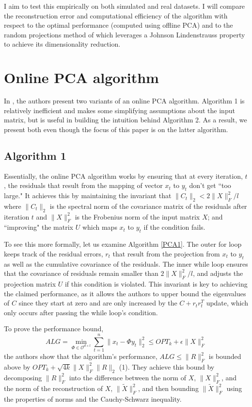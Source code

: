 \documentclass[11pt, oneside]{amsart}
\begin{document}
I aim to test this empirically on both simulated and real datasets. I will compare the reconstruction error and computational efficiency of the algorithm with respect to the optimal performance (computed using offline PCA) and to the random projections method of \cite{sarlos} which leverages a Johnson Lindenstrauss property to achieve its dimensionality reduction. 



\section{Online PCA algorithm}
In \cite{onlinepca}, the authors present two variants of an online PCA algorithm. Algorithm 1 is relatively inefficient and makes some simplifying assumptions about the input matrix, but is useful in building the intuition behind Algorithm 2. As a result, we present both even though the focus of this paper is on the latter algorithm.

\subsection{Algorithm 1}

Essentially, the online PCA algorithm works by ensuring that at every iteration, $t$, the residuals that result from the mapping of vector $x_t$ to $y_t$ don't get ``too large." It achieves this by  maintaining the invariant that $\| C_t\|_2 < 2 \| X\|_F^2/l$ where $\|C_t\|_2$ is the spectral norm of the covariance matrix of the residuals after iteration $t$ and $\| X\|_F^2$ is the Frobenius norm of the input matrix $X$; and ``improving" the matrix $U$ which maps $x_t$ to $y_t$ if the condition fails.

To see this more formally, let us examine Algorithm \ref{PCA1}. The outer for loop keeps track of the residual errors, $r_t$ that result from the projection from $x_t$ to $y_t$ as well as the cumulative covariance of the residuals. The inner while loop ensures that the covariance of residuals remain smaller than $2\|X\|_F^2/l$, and adjusts the projection matrix $U$ if this condition is violated. This invariant is key to achieving the claimed performance, as it allows the authors to upper bound the eigenvalues of $C$ since they start at zero and are only increased by the $C + r_t r_t^T$ update, which only occurs after passing the while loop's condition. 

To prove the performance bound, 
\[
ALG = \min_{\Phi \in \mathcal{O}^{d\times l}}\sum_{t=1}^n\|x_t - \Phi y_t\|_2^2\leq OPT_k + \epsilon \|X\|_F^2\]
the authors show that the algorithm's performance, $ALG \leq \|R\|_F^2$ is bounded above by $OPT_k + \sqrt{4k} \|X\|_F^2\|R\|_2$ (1). They achieve this bound by decomposing $\|R\|_F^2$ into the difference between the norm of $X$, $\|X\|_F^2$, and the norm of the reconstruction of $X$, $\|\tilde{X}\|_F^2$, and then bounding $\|\tilde{X}\|_F^2$ using the properties of norms and the Cauchy-Schwarz inequality.
\end{document}
